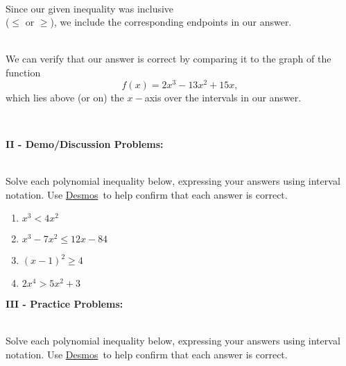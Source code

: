 \documentclass[12pt]{article}
\theoremstyle{definition}
\newcommand{\Desmos}{\href{https://www.desmos.com/}{Desmos}}
\begin{document}
\begin{multicols}{2}
\begin{center}
\end{center}

\columnbreak

\ \par
Since our given inequality was inclusive\\
($\leq$ or $\geq$), we include the corresponding endpoints in our answer.\\
\ \par
We can verify that our answer is correct by comparing it to the graph of the function $$f(x)=2x^3-13x^2+15x,$$ which lies above (or on) the $x-$axis over the intervals in our answer.
\end{multicols}
\ \par
{\bf II - Demo/Discussion Problems:}\\
\ \par
Solve each polynomial inequality below, expressing your answers using interval notation.  Use \Desmos \ to help confirm that each answer is correct.
\begin{enumerate}
 \item $x^3<4x^2$\\
 \item $x^3-7x^2\leq 12x-84$\\
 \item $(x - 1)^{2} \geq 4$\\
 \item $2x^4>5x^2+3$
\end{enumerate}
\pagebreak
{\bf III - Practice Problems:}\\
\ \par
Solve each polynomial inequality below, expressing your answers using interval notation.  Use \Desmos \ to help confirm that each answer is correct.
\end{document}
